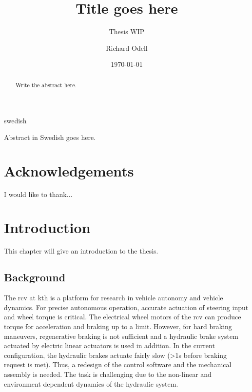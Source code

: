\documentclass[a4paper,11pt]{kth-mag}
\title{Title goes here}
\subtitle{Thesis WIP}
\author{Richard Odell}
\date{\today}
\begin{document}
\frontmatter
\pagestyle{empty}
\removepagenumbers
\maketitle
{}


\clearpage
\begin{abstract}

Write the abstract here.

\end{abstract}
\clearpage
\begin{foreignabstract}{swedish}

Abstract in Swedish goes here.

\end{foreignabstract}
\clearpage

\chapter*{Acknowledgements}

I would like to thank...



\glsaddall
\printglossary
\renewcommand{\glsnamefont}[1]{\textbf{#1}}
\printglossary[type=\acronymtype,style=super,nonumberlist,nopostdot,nogroupskip]


\clearpage
\clearpage
\tableofcontents*
\clearpage
\listoffigures*
\clearpage
\listoftables*
\glsaddall



\mainmatter
\pagestyle{newchap}


\chapter{Introduction}

This chapter will give an introduction to the thesis. 

\section{Background}

 
The \gls{rcv} at \gls{kth} is a platform for research in vehicle autonomy and vehicle dynamics. For precise autonomous operation, accurate actuation of steering input and wheel torque is critical. The electrical wheel motors of the \gls{rcv} can produce torque for acceleration and braking up to a limit. However, for hard braking maneuvers, regenerative braking is not sufficient and a hydraulic brake system actuated by electric linear actuators is used in addition. In the current configuration, the hydraulic brakes actuate fairly slow (>1s before braking request is met). Thus, a redesign of the control software and the mechanical assembly is needed. The task is challenging due to the non-linear and environment dependent dynamics of the hydraulic system.
\end{document}
